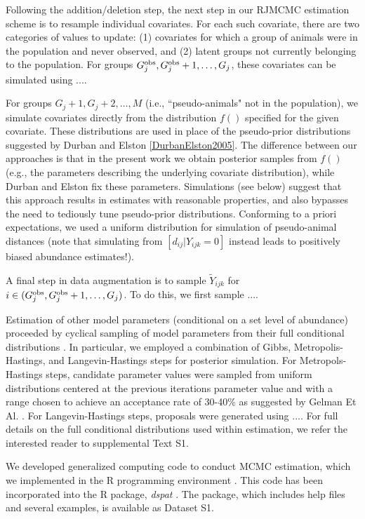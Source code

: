\documentclass[10pt]{article}
\begin{document}
Following the addition/deletion step, the next step in our RJMCMC estimation scheme is to resample individual covariates.  For each such covariate, there are two categories of values to update: (1) covariates for which a group of animals were in the population and never observed, and (2) latent groups not currently belonging to the population. For groups $G_{j}^{\rm obs},G_{j}^{\rm obs}+1,\hdots,G_j$, these covariates can be simulated using ....

For groups $G_j+1,G_j+2, \hdots,M$ (i.e., ``pseudo-animals" not in the population), we simulate covariates directly from the distribution $f()$ specified for the given covariate.  These distributions are used in place of the pseudo-prior distributions suggested by Durban and Elston \ref{DurbanElston2005}.  The difference between our approaches is that in the present work we obtain posterior samples from $f()$ (e.g., the parameters describing the underlying covariate distribution), while Durban and Elston fix these parameters.  Simulations (see below) suggest that this approach results in estimates with reasonable properties, and also bypasses the need to tediously tune pseudo-prior distributions.  Conforming to a priori expectations, we used a uniform distribution for simulation of pseudo-animal distances (note that simulating from $[d_{ij} | Y_{ijk}=0]$ instead leads to positively biased abundance estimates!).

A final step in data augmentation is to sample $\tilde{Y}_{ijk}$ for $i \in (G_j^{\rm obs}, G_j^{\rm obs}+1, \hdots, G_j)$.  To do this, we first sample ....

Estimation of other model parameters (conditional on a set level of abundance)  proceeded by cyclical sampling of model parameters from their full conditional distributions \cite{GelmanEtAl2004}.  In particular, we employed a combination of Gibbs, Metropolis-Hastings, and Langevin-Hastings steps for posterior simulation.  For Metropols-Hastings steps, candidate parameter values were sampled from uniform distributions centered at the previous iterations parameter value and with a range chosen to achieve an acceptance rate of 30-40\% as suggested by Gelman Et Al. \cite{GelmanEtAl2004}.  For Langevin-Hastings steps, proposals were generated using ....  For full details on the full conditional distributions used within estimation, we refer the interested reader to supplemental Text S1.

We developed generalized computing code to conduct MCMC estimation, which we implemented in the R programming environment \cite{RTeam2006}.  This code has been incorporated into the R package, \emph{dspat} \cite{JohnsonEtAl2010}.  The package, which includes help files and several examples, is available as Dataset S1.
\end{document}
